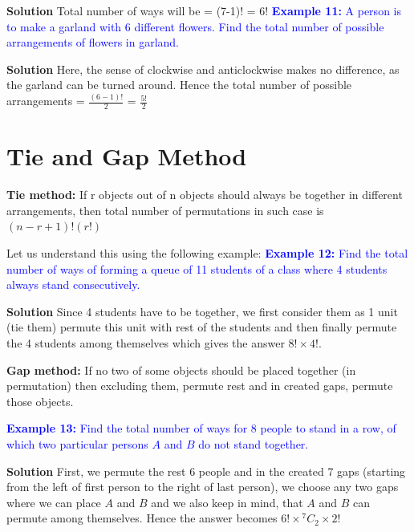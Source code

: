 \documentclass[12pt, a4paper]{article}
\begin{document}
\textbf{Solution} Total number of ways will be = (7-1)! = 6!\newline
\textcolor{blue}{\textbf{Example 11:} A person is to make a garland with 6 different flowers. Find the total number of possible arrangements of flowers in garland.}

\textbf{Solution} Here, the sense of clockwise and anticlockwise makes no difference, as the garland can be turned around. Hence the total number of possible arrangements = $\frac{(6-1)!}{2}$ = $\frac{5!}{2}$
\section{Tie and Gap Method}
\begin{tcolorbox}[colback=TealBlue!10!White,colframe=TealBlue!50!black]
\textbf{Tie method:} If r objects out of n objects should always be together in different arrangements, then total number of permutations in such case is $(n-r+1)!(r!)$
\end{tcolorbox}
Let us understand this using the following example:\newline
\textcolor{blue}{\textbf{Example 12:} Find the total number of ways of forming a queue of 11 students of a class where 4 students always stand consecutively.}

\textbf{Solution} Since 4 students have to be together, we first consider them as 1 unit (tie them) permute this unit with rest of the students and then finally permute the 4 students among themselves which gives the answer $8! \times 4!$.
\begin{tcolorbox}[colback=TealBlue!10!White,colframe=TealBlue!50!black]
\textbf{Gap method:} If no two of some objects should be placed together (in permutation) then excluding them, permute rest and in created gaps, permute those objects.
\end{tcolorbox}
\textcolor{blue}{\textbf{Example 13:} Find the total number of ways for 8 people to stand in a row, of which two particular persons $A$ and $B$ do not stand together.}

\textbf{Solution} First, we permute the rest 6 people and in the created 7 gaps (starting from the left of first person to the right of last person), we choose any two gaps where we can place $A$ and $B$ and we also keep in mind, that $A$ and $B$ can permute among themselves. Hence the answer becomes $6! \times {^7C_2}\times 2!$
\end{document}
